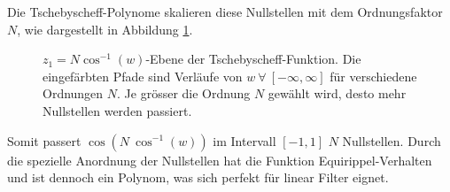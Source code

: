 Die Tschebyscheff-Polynome skalieren diese Nullstellen mit dem Ordnungsfaktor $N$, wie dargestellt in Abbildung \ref{ellfilter:fig:arccos2}.
\begin{figure}
    \centering
    
    \caption{
        $z_1=N \cos^{-1}(w)$-Ebene der Tschebyscheff-Funktion.
        Die eingefärbten Pfade sind Verläufe von $w~\forall~[-\infty, \infty]$ für verschiedene Ordnungen $N$.
        Je grösser die Ordnung $N$ gewählt wird, desto mehr Nullstellen werden passiert.
    }
    \label{ellfilter:fig:arccos2}
\end{figure}
Somit passert $\cos( N~\cos^{-1}(w))$ im Intervall $[-1, 1]$ $N$ Nullstellen.
Durch die spezielle Anordnung der Nullstellen hat die Funktion Equirippel-Verhalten und ist dennoch ein Polynom, was sich perfekt für linear Filter eignet.
